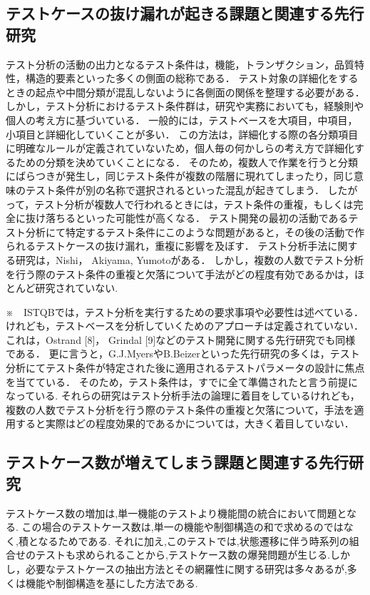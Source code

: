 \documentclass[a4paper,11pt]{jreport}
\begin{document}
\subsection{テストケースの抜け漏れが起きる課題と関連する先行研究}
テスト分析の活動の出力となるテスト条件は，機能，トランザクション，品質特性，構造的要素といった多くの側面の総称である．
テスト対象の詳細化をするときの起点や中間分類が混乱しないように各側面の関係を整理する必要がある．
しかし，テスト分析におけるテスト条件群は，研究や実務においても，経験則や個人の考え方に基づいている．
一般的には，テストベースを大項目，中項目，小項目と詳細化していくことが多い．
この方法は，詳細化する際の各分類項目に明確なルールが定義されていないため，個人毎の何かしらの考え方で詳細化するための分類を決めていくことになる．
そのため，複数人で作業を行うと分類にばらつきが発生し，同じテスト条件が複数の階層に現れてしまったり，同じ意味のテスト条件が別の名称で選択されるといった混乱が起きてしまう．
したがって，テスト分析が複数人で行われるときには，テスト条件の重複，もしくは完全に抜け落ちるといった可能性が高くなる．
テスト開発の最初の活動であるテスト分析にて特定するテスト条件にこのような問題があると，その後の活動で作られるテストケースの抜け漏れ，重複に影響を及ぼす．
テスト分析手法に関する研究は，Nishi\cite{nishi2012based}， Akiyama\cite{Akiyama2014}, Yumoto\cite{yumoto2013test}がある．
しかし，複数の人数でテスト分析を行う際のテスト条件の重複と欠落について手法がどの程度有効であるかは，ほとんど研究されていない.

※　ISTQBでは，テスト分析を実行するための要求事項や必要性は述べている．
けれども，テストベースを分析していくためのアプローチは定義されていない．
これは，Ostrand [8]， Grindal [9]などのテスト開発に関する先行研究でも同様である．
更に言うと，G.J.MyersやB.Beizerといった先行研究の多くは，テスト分析にてテスト条件が特定された後に適用されるテストパラメータの設計に焦点を当てている．
そのため，テスト条件は，すでに全て準備されたと言う前提になっている.
それらの研究はテスト分析手法の論理に着目をしているけれども，複数の人数でテスト分析を行う際のテスト条件の重複と欠落について，手法を適用すると実際はどの程度効果的であるかについては，大きく着目していない．

\subsection{テストケース数が増えてしまう課題と関連する先行研究}
テストケース数の増加は,単一機能のテストより機能間の統合において問題となる.
この場合のテストケース数は,単一の機能や制御構造の和で求めるのではなく,積となるためである.
それに加え,このテストでは,状態遷移に伴う時系列の組合せのテストも求められることから,テストケース数の爆発問題が生じる.しかし，必要なテストケースの抽出方法とその網羅性に関する研究は多々あるが,多くは機能や制御構造を基にした方法である.\cite{myers2011art}
\end{document}
